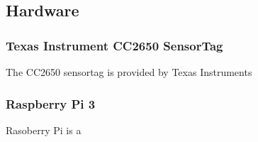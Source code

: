 \subsection{Hardware}

\subsubsection{Texas Instrument CC2650 SensorTag}

The CC2650 sensortag is provided by Texas Instruments\cite{CC2650}

\subsubsection{Raspberry Pi 3}
Rasoberry Pi is a \cite{RP3}
